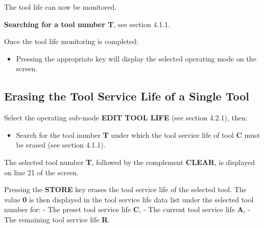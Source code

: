 The tool life can now be monitored.

\textbf{Searching for a tool number T}, see section 4.1.1.

Once the tool life monitoring is completed:

\begin{itemize}
    \item Pressing the appropriate key will display the selected operating mode on the screen.
\end{itemize}

\subsection{Erasing the Tool Service Life of a Single Tool}

Select the operating sub-mode \textbf{EDIT TOOL LIFE} (see section 4.2.1), then:

\begin{itemize}
    \item Search for the tool number \textbf{T} under which the tool service life of tool \textbf{C} must be erased (see section 4.1.1).
\end{itemize}

\begin{itemize}
\end{itemize}


\begin{itemize}
\end{itemize}

The selected tool number \textbf{T}, followed by the complement \textbf{CLEAR}, is displayed on line 21 of the screen.

\begin{itemize}
\end{itemize}

Pressing the \textbf{STORE} key erases the tool service life of the selected tool.  
The value \textbf{0} is then displayed in the tool service life data list under the selected tool number for:  
- The preset tool service life \textbf{C},  
- The current tool service life \textbf{A},  
- The remaining tool service life \textbf{R}.

